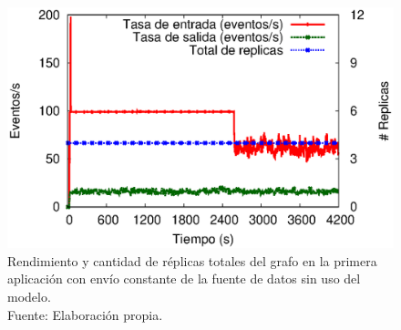 \begin{figure}[!ht]
	\centering
	\captionsetup{justification=centering}
	\includegraphics[scale=0.65]{images/exp/app1/uniform/sm/processSystem.eps}
    \caption[Rendimiento y cantidad de réplicas totales del grafo en la primera aplicación con envío constante de la fuente de datos sin uso del modelo.]{Rendimiento y cantidad de réplicas totales del grafo en la primera aplicación con envío constante de la fuente de datos sin uso del modelo.\\Fuente: Elaboración propia.}
	\label{fig:app1-uniform-processSystem-sm}
\end{figure}



